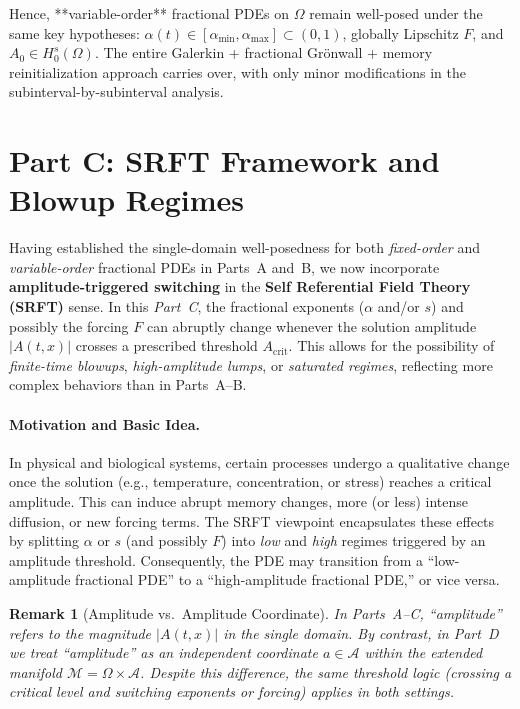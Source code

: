 \documentclass[12pt]{article}
\newtheorem{remark}[theorem]{Remark}
\begin{document}
Hence, **variable-order** fractional PDEs on \(\Omega\) remain well-posed under the same
key hypotheses: \(\alpha(t)\in[\alpha_{\min},\alpha_{\max}]\subset(0,1)\), globally
Lipschitz \(F\), and \(A_0\in H_0^s(\Omega)\). The entire Galerkin + fractional Grönwall
+ memory reinitialization approach carries over, with only minor modifications in the
subinterval-by-subinterval analysis.
\section{Part C: SRFT Framework and Blowup Regimes}
\label{sec:erm_blowup}

Having established the single-domain well-posedness for both \emph{fixed-order} and \emph{variable-order} fractional PDEs in Parts~A and~B, we now incorporate \textbf{amplitude-triggered switching} in the \textbf{Self Referential Field Theory (SRFT)} sense. In this \emph{Part~C}, the fractional exponents (\(\alpha\) and/or \(s\)) and possibly the forcing \(F\) can abruptly change whenever the solution amplitude \(\lvert A(t,x)\rvert\) crosses a prescribed threshold \(A_{\mathrm{crit}}\). This allows for the possibility of \emph{finite-time blowups}, \emph{high-amplitude lumps}, or \emph{saturated regimes}, reflecting more complex behaviors than in Parts~A--B.

\paragraph{Motivation and Basic Idea.}
In physical and biological systems, certain processes undergo a qualitative change once the solution (e.g., temperature, concentration, or stress) reaches a critical amplitude. This can induce abrupt memory changes, more (or less) intense diffusion, or new forcing terms. The SRFT viewpoint encapsulates these effects by splitting \(\alpha\) or \(s\) (and possibly \(F\)) into \emph{low} and \emph{high} regimes triggered by an amplitude threshold. Consequently, the PDE may transition from a “low-amplitude fractional PDE” to a “high-amplitude fractional PDE,” or vice versa.

\begin{remark}[Amplitude vs.\ Amplitude Coordinate]
In Parts~A--C, “amplitude” refers to the magnitude $\lvert A(t,x)\rvert$ in the single domain.
By contrast, in Part~D we treat “amplitude” as an \emph{independent coordinate} $a\in\mathcal{A}$
within the extended manifold $\mathcal{M}=\Omega\times\mathcal{A}$. 
Despite this difference, the same threshold logic (crossing a critical level and switching 
exponents or forcing) applies in both settings.
\end{remark}
\end{document}
